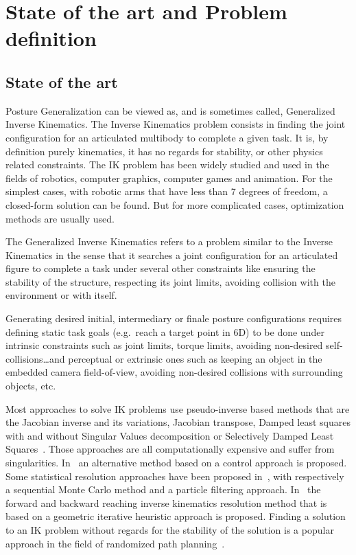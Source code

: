 
\chapter{State of the art and Problem definition}
\label{cha:state_of_the_art_and_problem_definition}

\section{State of the art}
\label{sec:state_of_the_art}

Posture Generalization can be viewed as, and is sometimes called, Generalized Inverse Kinematics.
The Inverse Kinematics problem consists in finding the joint configuration for an articulated multibody to complete a given task.
It is, by definition purely kinematics, it has no regards for stability, or other physics related constraints.
The IK problem has been widely studied and used in the fields of robotics, computer graphics, computer games and animation.
For the simplest cases, with robotic arms that have less than 7 degrees of freedom, a closed-form solution can be found.
But for more complicated cases, optimization methods are usually used.

The Generalized Inverse Kinematics refers to a problem similar to the Inverse Kinematics in the sense that it searches a joint configuration for an articulated figure to complete a task under several other constraints like ensuring the stability of the structure, respecting its joint limits, avoiding collision with the environment or with itself.

Generating desired initial, intermediary or finale posture configurations requires defining static task goals (e.g.\ reach a target point in 6D) to be done under intrinsic constraints such as joint limits, torque limits, avoiding non-desired self-collisions\ldots and perceptual or extrinsic ones such as keeping an object in the embedded camera field-of-view, avoiding non-desired collisions with surrounding objects, etc.

Most approaches to solve IK problems use pseudo-inverse based methods that are the Jacobian inverse and its variations, Jacobian transpose, Damped least squares with and without Singular Values decomposition or Selectively Damped Least Squares~\cite{balestrino1984robust, tolani2000real, baillieul1985kinematic, wampler1986manipulator, nakamura1986inverse, buss2005selectively}.
Those approaches are all computationally expensive and suffer from singularities.
In~\cite{pechev2008inverse} an alternative method based on a control approach is proposed.
Some statistical resolution approaches have been proposed in~\cite{courty2008inverse, hecker2008real}, with respectively a sequential Monte Carlo method and a particle filtering approach.
In~\cite{AristidouFABRIK, Aristidou:2016_ExtFABRIK} the forward and backward reaching inverse kinematics resolution method that is based on a geometric iterative heuristic approach is proposed.
Finding a solution to an IK problem without regards for the stability of the solution is a popular approach in the field of randomized path planning~\cite{cortes2002random, lavalle1999probabilistic}.

